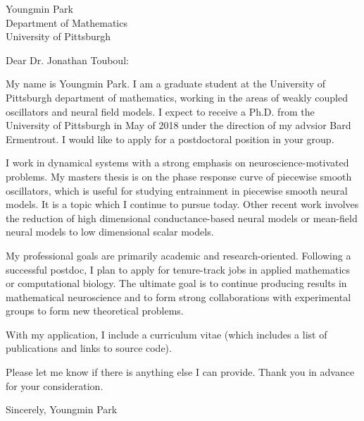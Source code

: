 \documentclass[a4paper,11pt]{letter}
\begin{document}
\begin{letter}{Youngmin Park \\ Department of Mathematics\\ University of Pittsburgh}
 

\opening{Dear Dr. Jonathan Touboul:}

My name is Youngmin Park. I am a graduate student at the University of Pittsburgh department of mathematics, working in the areas of weakly coupled oscillators and neural field models. I expect to receive a Ph.D. from the University of Pittsburgh in May of 2018 under the direction of my advsior Bard Ermentrout. I would like to apply for a postdoctoral position in your group.

I work in dynamical systems with a strong emphasis on neuroscience-motivated problems. My masters thesis is on the phase response curve of piecewise smooth oscillators, which is useful for studying entrainment in piecewise smooth neural models. It is a topic which I continue to pursue today. Other recent work involves the reduction of high dimensional conductance-based neural models or mean-field neural models to low dimensional scalar models.

My professional goals are primarily academic and research-oriented. Following a successful postdoc, I plan to apply for tenure-track jobs in applied mathematics or computational biology. The ultimate goal is to continue producing results in mathematical neuroscience and to form strong collaborations with experimental groups to form new theoretical problems.

With my application, I include a curriculum vitae (which includes a list of publications and links to source code).

Please let me know if there is anything else I can provide. Thank you in advance for your consideration.

Sincerely,
Youngmin Park
 
 
 
\end{letter}
\end{document}
